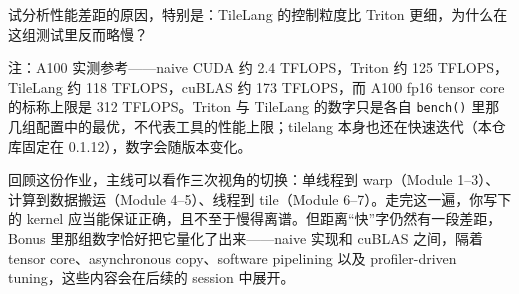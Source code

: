 \documentclass[11pt,a4paper,fontset=none]{ctexart}
\begin{document}
试分析性能差距的原因，特别是：TileLang 的控制粒度比 Triton 更细，为什么在这组测试里反而略慢？

注：A100 实测参考——naive CUDA 约 2.4 TFLOPS，Triton 约 125 TFLOPS，TileLang 约 118 TFLOPS，cuBLAS 约 173 TFLOPS，而 A100 fp16 tensor core 的标称上限是 312 TFLOPS。Triton 与 TileLang 的数字只是各自 \texttt{bench()} 里那几组配置中的最优，不代表工具的性能上限；tilelang 本身也还在快速迭代（本仓库固定在 0.1.12），数字会随版本变化。
\begin{lookback}
回顾这份作业，主线可以看作三次视角的切换：单线程到 warp（Module 1--3）、计算到数据搬运（Module 4--5）、线程到 tile（Module 6--7）。走完这一遍，你写下的 kernel 应当能保证正确，且不至于慢得离谱。但距离“快”字仍然有一段差距，Bonus 里那组数字恰好把它量化了出来——naive 实现和 cuBLAS 之间，隔着 tensor core、asynchronous copy、software pipelining 以及 profiler-driven tuning，这些内容会在后续的 session 中展开。
\end{lookback}
\end{document}
